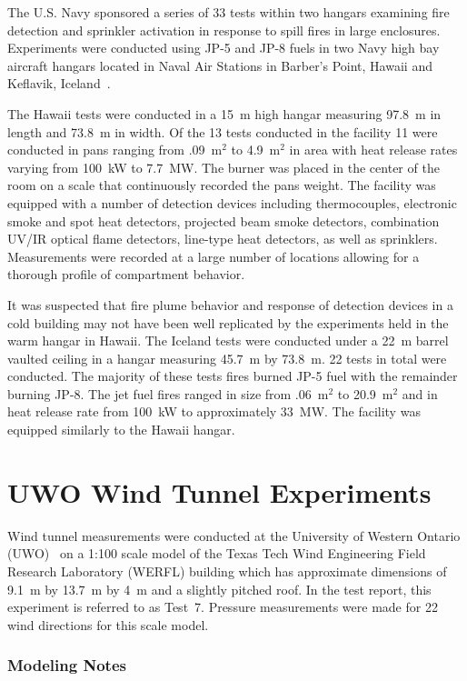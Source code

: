 The U.S. Navy sponsored a series of 33 tests within two hangars examining fire detection and sprinkler activation in response to spill fires in large enclosures. Experiments were conducted using JP-5 and JP-8 fuels in two Navy high bay aircraft hangars located in Naval Air Stations in Barber's Point, Hawaii and Keflavik, Iceland~\cite{Gott:1}.

The Hawaii tests were conducted in a 15~m high hangar measuring 97.8~m in length and 73.8~m in width. Of the 13 tests conducted in the facility 11 were conducted in pans ranging from .09~m$^2$ to 4.9~m$^2$ in area with heat release rates varying from 100~kW to 7.7~MW. The burner was placed in the center of the room on a scale that continuously recorded the pans weight. The facility was equipped with a number of detection devices including thermocouples, electronic smoke and spot heat detectors, projected beam smoke detectors, combination UV/IR optical flame detectors, line-type heat detectors, as well as sprinklers. Measurements were recorded at a large number of locations allowing for a thorough profile of compartment behavior.

It was suspected that fire plume behavior and response of detection devices in a cold building may not have been well replicated by the experiments held in the warm hangar in Hawaii. The Iceland tests were conducted under a 22~m barrel vaulted ceiling in a hangar measuring 45.7~m by 73.8~m. 22 tests in total were conducted. The majority of these tests fires burned JP-5 fuel with the remainder burning JP-8. The jet fuel fires ranged in size from .06~m$^2$ to 20.9~m$^2$ and in heat release rate from 100~kW to approximately 33~MW. The facility was equipped similarly to the Hawaii hangar.



\section{UWO Wind Tunnel Experiments}
\label{UWO_Wind_Tunnel_Description}

Wind tunnel measurements were conducted at the University of Western Ontario (UWO)~\cite{UWO_Wind_Tunnel_Report} on a 1:100 scale model of the Texas Tech Wind Engineering Field Research Laboratory (WERFL) building which has approximate dimensions of 9.1~m by 13.7~m by 4~m and a slightly pitched roof. In the test report, this experiment is referred to as Test~7. Pressure measurements were made for 22 wind directions for this scale model.

\subsubsection{Modeling Notes}

